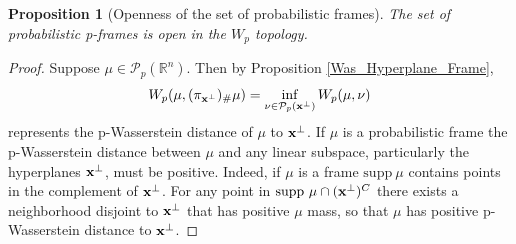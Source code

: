 \documentclass{amsart}
\numberwithin{equation}{section}
\newcommand\cP{{\mathcal P}}
\newcommand\R{{\mathbb R}}
\theoremstyle{plain}
\newtheorem{proposition}[subsection]{Proposition}
\theoremstyle{definition}
\begin{document}
\begin{proposition}[Openness of the set of probabilistic frames]
The set of probabilistic p-frames is open in the $W_p$ topology. 
\end{proposition}
\begin{proof} 
Suppose $\mu \in \cP_p(\R^n)$. Then by Proposition \ref{Was_Hyperplane_Frame},
$$W_p(\mu, (\pi_{{\bf x}^{\perp}})_{\#}\mu)=\inf_{\nu \in \cP_p({\bf x}^{\perp})}W_p(\mu, \nu)$$  
represents the p-Wasserstein distance of $\mu$ to ${\bf x}^{\perp}$.  
If $\mu$ is a probabilistic frame the p-Wasserstein distance between $\mu$ and any linear subspace, particularly the hyperplanes ${\bf x}^{\perp}$, must be positive.    
Indeed, if $\mu$ is a frame $\text{supp}\ \mu$ contains points in the complement of ${\bf x}^{\perp}$.  For any point in $\text{supp}\ \mu \cap ({\bf x}^{\perp})^C$ there exists a neighborhood disjoint to ${\bf x}^{\perp}$ that has positive $\mu$ mass, so that $\mu$ has positive p-Wasserstein distance to ${\bf x}^{\perp}$. 


\end{proof}
\end{document}
